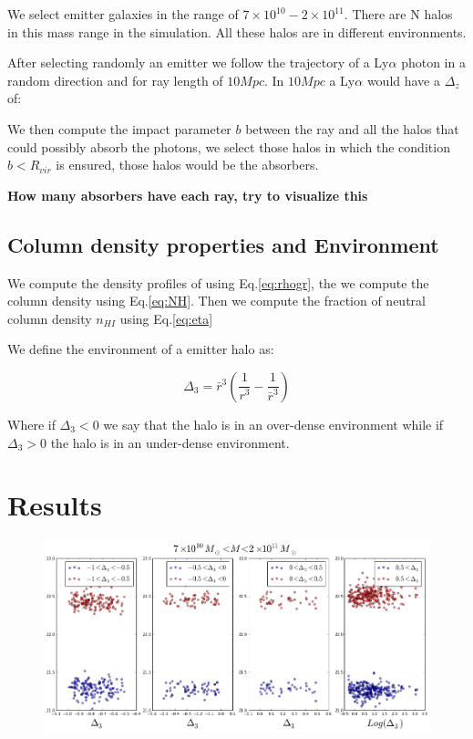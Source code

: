 \documentclass[12pt]{article}
\begin{document}
We select emitter galaxies in the range of $7 \times 10^{10} - 2 \times 10^{11}$.
There are N halos in this mass range in the simulation. All these halos
are in different environments.

After selecting randomly an emitter we follow the trajectory of a Ly$\alpha$ photon
in a random direction and for ray length of $10 Mpc$. In $10 Mpc$ a Ly$\alpha$ would
have a $\Delta_z$ of: 


We then compute the impact parameter $b$ between the ray and all the halos that could
possibly absorb the photons, we select those halos in which the condition $b<R_{vir}$
is ensured, those halos would be the absorbers.



\textbf{How many absorbers have each ray, try to visualize this}

\subsection{Column density properties and Environment}

We compute the density profiles of using Eq.\ref{eq:rhogr}, the
we compute the column density using Eq.\ref{eq:NH}. Then we compute
the fraction of neutral column density $n_{HI}$ using Eq.\ref{eq:eta}

We define the environment of a emitter halo as:

\begin{equation}
\Delta_3  = \bar{r}^3 \left( \dfrac{1}{r^3} - \dfrac{1}{\bar{r}^3} \right)
\end{equation}

Where if $\Delta_3 < 0 $ we say that the halo is in an over-dense
environment while
if $\Delta_3 > 0 $ the halo is in an under-dense environment.

\section{Results}

\begin{figure}[H]
\centering
\includegraphics[scale=0.4]{../figures/NHI.png}
\end{figure}
\end{document}

